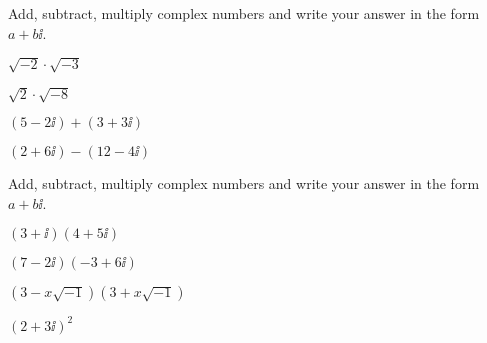 \newpage

\begin{exercise}
	Add, subtract, multiply complex numbers and write your answer in the form $a+b\ii$.

	\begin{enumerate*}[label={(\arabic*)~}]
		\item  $\sqrt{-2}\cdot\sqrt{-3}$ 
		\item  $\sqrt{2}\cdot\sqrt{-8}$
		\item  $(5-2\ii)+(3+3\ii)$
		\item $(2+6\ii)-(12-4\ii)$ 
		\hfill\null
	\end{enumerate*}

\end{exercise}

\vfill
\begin{center} \hfill
\end{center}

\begin{exercise}
	Add, subtract, multiply complex numbers and write your answer in the form $a+b\ii$.

\begin{enumerate*}[label={(\arabic*)~}]
	\item  $(3+\ii)(4+5\ii)$
	\item  $(7-2\ii)(-3+6\ii)$
	\item  $(3-x\sqrt{-1})(3+x\sqrt{-1})$ 
	\item  $(2+3\ii)^2$
\hfill\null
\end{enumerate*}
\end{exercise}

\begin{center} \hfill
{}
\end{center}



